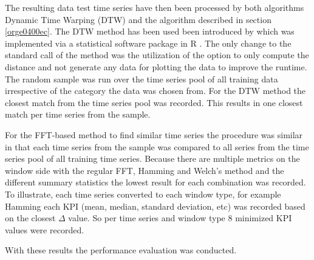 \documentclass[phd,black, hidelinks]{PrincetonThesis}
\begin{document}
The resulting data test time series have then been processed by both algorithms Dynamic Time Warping (DTW) and the algorithm described in section \ref{orge0400ec}. The DTW method has been used been introduced by \citeauthor{giorgino2009} which was implemented via a statistical software package in R \cite{giorgino2009}. The only change to the standard call of the method was the utilization of the option to only compute the distance and not generate any data for plotting the data to improve the runtime. The random sample was run over the time series pool of all training data irrespective of the category the data was chosen from. For the DTW method the closest match from the time series pool was recorded. This results in one closest match per time series from the sample.

For the FFT-based method to find similar time series the procedure was similar in that each time series from the sample was compared to all series from the time series pool of all training time series. Because there are multiple metrics on the window side with the regular FFT, Hamming and Welch's method and the different summary statistics the lowest result for each combination was recorded. To illustrate, each time series converted to each window type, for example Hamming each KPI (mean, median, standard deviation, etc) was recorded based on the closest \(\Delta\) value. So per time series and window type 8 minimized KPI values were recorded.

With these results the performance evaluation was conducted.
\end{document}
